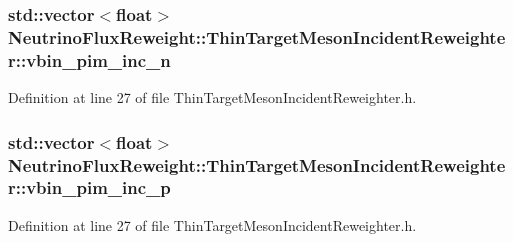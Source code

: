 \hypertarget{class_neutrino_flux_reweight_1_1_thin_target_meson_incident_reweighter_a7eba845bf5fa002d9e3634318d662568}{
\subsubsection[{vbin\-\_\-pim\-\_\-inc\-\_\-n}]{\setlength{\rightskip}{0pt plus 5cm}std\-::vector$<$float$>$ Neutrino\-Flux\-Reweight\-::\-Thin\-Target\-Meson\-Incident\-Reweighter\-::vbin\-\_\-pim\-\_\-inc\-\_\-n}}\label{class_neutrino_flux_reweight_1_1_thin_target_meson_incident_reweighter_a7eba845bf5fa002d9e3634318d662568}


Definition at line 27 of file Thin\-Target\-Meson\-Incident\-Reweighter.\-h.

\hypertarget{class_neutrino_flux_reweight_1_1_thin_target_meson_incident_reweighter_a66fec429ebe5b6e00e3f015ac3796297}{
\subsubsection[{vbin\-\_\-pim\-\_\-inc\-\_\-p}]{\setlength{\rightskip}{0pt plus 5cm}std\-::vector$<$float$>$ Neutrino\-Flux\-Reweight\-::\-Thin\-Target\-Meson\-Incident\-Reweighter\-::vbin\-\_\-pim\-\_\-inc\-\_\-p}}\label{class_neutrino_flux_reweight_1_1_thin_target_meson_incident_reweighter_a66fec429ebe5b6e00e3f015ac3796297}


Definition at line 27 of file Thin\-Target\-Meson\-Incident\-Reweighter.\-h.

